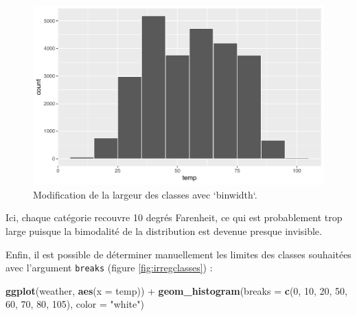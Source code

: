 \documentclass[a4paperpaper,]{article}
\newenvironment{Shaded}{\begin{snugshade}}{\end{snugshade}}
\newcommand{\DataTypeTok}[1]{\textcolor[rgb]{0.00,0.34,0.68}{#1}}
\newcommand{\DecValTok}[1]{\textcolor[rgb]{0.69,0.50,0.00}{#1}}
\newcommand{\KeywordTok}[1]{\textcolor[rgb]{0.12,0.11,0.11}{\textbf{#1}}}
\newcommand{\NormalTok}[1]{\textcolor[rgb]{0.12,0.11,0.11}{#1}}
\newcommand{\OperatorTok}[1]{\textcolor[rgb]{0.12,0.11,0.11}{#1}}
\newcommand{\StringTok}[1]{\textcolor[rgb]{0.75,0.01,0.01}{#1}}
\begin{document}
\begin{figure}[htpb]

{\centering \includegraphics[width=0.9\linewidth]{figure/unnamed-chunk-50-1} 

}

\caption{Modification de la largeur des classes avec `binwidth`.}\label{fig:unnamed-chunk-50}
\end{figure}

Ici, chaque catégorie recouvre 10 degrés Farenheit, ce qui est probablement trop large puisque la bimodalité de la distribution est devenue presque invisible.

Enfin, il est possible de déterminer manuellement les limites des classes souhaitées avec l'argument \texttt{breaks} (figure \ref{fig:irregclasses}) :

\begin{Shaded}
\begin{Highlighting}[]
\KeywordTok{ggplot}\NormalTok{(weather, }\KeywordTok{aes}\NormalTok{(}\DataTypeTok{x =}\NormalTok{ temp)) }\OperatorTok{+}
\StringTok{  }\KeywordTok{geom_histogram}\NormalTok{(}\DataTypeTok{breaks =} \KeywordTok{c}\NormalTok{(}\DecValTok{0}\NormalTok{, }\DecValTok{10}\NormalTok{, }\DecValTok{20}\NormalTok{, }\DecValTok{50}\NormalTok{, }\DecValTok{60}\NormalTok{, }\DecValTok{70}\NormalTok{, }\DecValTok{80}\NormalTok{, }\DecValTok{105}\NormalTok{), }\DataTypeTok{color =} \StringTok{"white"}\NormalTok{)}
\end{Highlighting}
\end{Shaded}
\end{document}
